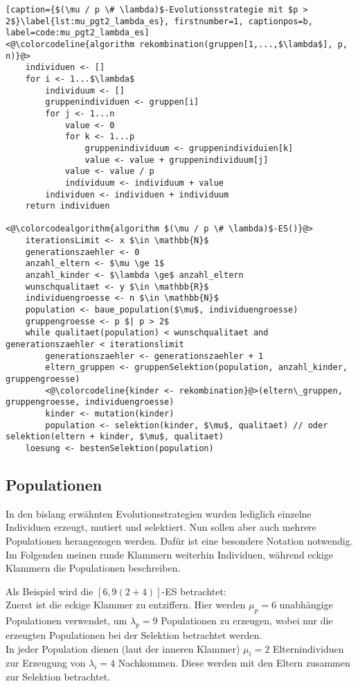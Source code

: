 \begin{lstlisting}[caption={$(\mu / p \# \lambda)$-Evolutionsstrategie mit $p > 2$}\label{lst:mu_pgt2_lambda_es}, firstnumber=1, captionpos=b, label=code:mu_pgt2_lambda_es]
<@\colorcodeline{algorithm rekombination(gruppen[1,...,$\lambda$], p, n)}@>
	individuen <- []
	for i <- 1...$\lambda$
		individuum <- []
		gruppenindividuen <- gruppen[i]
		for j <- 1...n
			value <- 0
			for k <- 1...p
				gruppenindividuum <- gruppenindividuien[k]
				value <- value + gruppenindividuum[j]
			value <- value / p
			individuum <- individuum + value
		individuen <- individuen + individuum
	return individuen

<@\colorcodealgorithm{algorithm $(\mu / p \# \lambda)$-ES()}@>
	iterationsLimit <- x $\in \mathbb{N}$
	generationszaehler <- 0
	anzahl_eltern <- $\mu \ge 1$
	anzahl_kinder <- $\lambda \ge$ anzahl_eltern
	wunschqualitaet <- y $\in \mathbb{R}$
	individuengroesse <- n $\in \mathbb{N}$
	population <- baue_population($\mu$, individuengroesse)
	gruppengroesse <- p $| p > 2$
	while qualitaet(population) < wunschqualitaet and generationszaehler < iterationslimit
		generationszaehler <- generationszaehler + 1
		eltern_gruppen <- gruppenSelektion(population, anzahl_kinder, gruppengroesse)
		<@\colorcodeline{kinder <- rekombination}@>(eltern\_gruppen, gruppengroesse, individuengroesse)
		kinder <- mutation(kinder)
		population <- selektion(kinder, $\mu$, qualitaet) // oder selektion(eltern + kinder, $\mu$, qualitaet)
	loesung <- bestenSelektion(population)
\end{lstlisting}

\subsection{Populationen}

In den bislang erwähnten Evolutionsstrategien wurden lediglich einzelne Individuen erzeugt, mutiert und selektiert.
Nun sollen aber auch mehrere Populationen herangezogen werden.
Dafür ist eine besondere Notation notwendig.
Im Folgenden meinen runde Klammern weiterhin Individuen, während eckige Klammern die Populationen beschreiben.

Als Beispiel wird die $[6,9(2+4)]$-ES betrachtet:\\
Zuerst ist die eckige Klammer zu entziffern. Hier werden $\mu_p = 6$ unabhängige Populationen verwendet, um  $\lambda_p = 9$ Populationen zu erzeugen, wobei nur die erzeugten Populationen bei der Selektion betrachtet werden.\\
In jeder Population dienen (laut der inneren Klammer) $\mu_i = 2$ Elternindividuen zur Erzeugung von $\lambda_i = 4$ Nachkommen. Diese werden mit den Eltern zusammen zur Selektion betrachtet.

